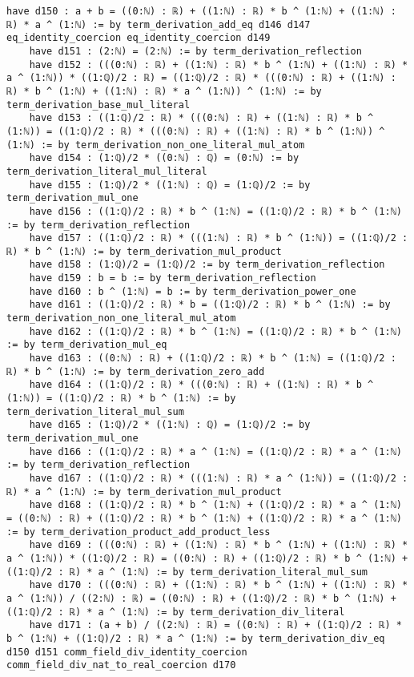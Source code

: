 \documentclass{article}
\begin{document}
\begin{tcolorbox}[colback=white!10, width=\linewidth]
\begin{lstlisting}[language=Lean4]
    have d150 : a + b = ((0:ℕ) : ℝ) + ((1:ℕ) : ℝ) * b ^ (1:ℕ) + ((1:ℕ) : ℝ) * a ^ (1:ℕ) := by term_derivation_add_eq d146 d147 eq_identity_coercion eq_identity_coercion d149
    have d151 : (2:ℕ) = (2:ℕ) := by term_derivation_reflection
    have d152 : (((0:ℕ) : ℝ) + ((1:ℕ) : ℝ) * b ^ (1:ℕ) + ((1:ℕ) : ℝ) * a ^ (1:ℕ)) * ((1:ℚ)/2 : ℝ) = ((1:ℚ)/2 : ℝ) * (((0:ℕ) : ℝ) + ((1:ℕ) : ℝ) * b ^ (1:ℕ) + ((1:ℕ) : ℝ) * a ^ (1:ℕ)) ^ (1:ℕ) := by term_derivation_base_mul_literal
    have d153 : ((1:ℚ)/2 : ℝ) * (((0:ℕ) : ℝ) + ((1:ℕ) : ℝ) * b ^ (1:ℕ)) = ((1:ℚ)/2 : ℝ) * (((0:ℕ) : ℝ) + ((1:ℕ) : ℝ) * b ^ (1:ℕ)) ^ (1:ℕ) := by term_derivation_non_one_literal_mul_atom
    have d154 : (1:ℚ)/2 * ((0:ℕ) : ℚ) = (0:ℕ) := by term_derivation_literal_mul_literal
    have d155 : (1:ℚ)/2 * ((1:ℕ) : ℚ) = (1:ℚ)/2 := by term_derivation_mul_one
    have d156 : ((1:ℚ)/2 : ℝ) * b ^ (1:ℕ) = ((1:ℚ)/2 : ℝ) * b ^ (1:ℕ) := by term_derivation_reflection
    have d157 : ((1:ℚ)/2 : ℝ) * (((1:ℕ) : ℝ) * b ^ (1:ℕ)) = ((1:ℚ)/2 : ℝ) * b ^ (1:ℕ) := by term_derivation_mul_product
    have d158 : (1:ℚ)/2 = (1:ℚ)/2 := by term_derivation_reflection
    have d159 : b = b := by term_derivation_reflection
    have d160 : b ^ (1:ℕ) = b := by term_derivation_power_one
    have d161 : ((1:ℚ)/2 : ℝ) * b = ((1:ℚ)/2 : ℝ) * b ^ (1:ℕ) := by term_derivation_non_one_literal_mul_atom
    have d162 : ((1:ℚ)/2 : ℝ) * b ^ (1:ℕ) = ((1:ℚ)/2 : ℝ) * b ^ (1:ℕ) := by term_derivation_mul_eq
    have d163 : ((0:ℕ) : ℝ) + ((1:ℚ)/2 : ℝ) * b ^ (1:ℕ) = ((1:ℚ)/2 : ℝ) * b ^ (1:ℕ) := by term_derivation_zero_add
    have d164 : ((1:ℚ)/2 : ℝ) * (((0:ℕ) : ℝ) + ((1:ℕ) : ℝ) * b ^ (1:ℕ)) = ((1:ℚ)/2 : ℝ) * b ^ (1:ℕ) := by term_derivation_literal_mul_sum
    have d165 : (1:ℚ)/2 * ((1:ℕ) : ℚ) = (1:ℚ)/2 := by term_derivation_mul_one
    have d166 : ((1:ℚ)/2 : ℝ) * a ^ (1:ℕ) = ((1:ℚ)/2 : ℝ) * a ^ (1:ℕ) := by term_derivation_reflection
    have d167 : ((1:ℚ)/2 : ℝ) * (((1:ℕ) : ℝ) * a ^ (1:ℕ)) = ((1:ℚ)/2 : ℝ) * a ^ (1:ℕ) := by term_derivation_mul_product
    have d168 : ((1:ℚ)/2 : ℝ) * b ^ (1:ℕ) + ((1:ℚ)/2 : ℝ) * a ^ (1:ℕ) = ((0:ℕ) : ℝ) + ((1:ℚ)/2 : ℝ) * b ^ (1:ℕ) + ((1:ℚ)/2 : ℝ) * a ^ (1:ℕ) := by term_derivation_product_add_product_less
    have d169 : (((0:ℕ) : ℝ) + ((1:ℕ) : ℝ) * b ^ (1:ℕ) + ((1:ℕ) : ℝ) * a ^ (1:ℕ)) * ((1:ℚ)/2 : ℝ) = ((0:ℕ) : ℝ) + ((1:ℚ)/2 : ℝ) * b ^ (1:ℕ) + ((1:ℚ)/2 : ℝ) * a ^ (1:ℕ) := by term_derivation_literal_mul_sum
    have d170 : (((0:ℕ) : ℝ) + ((1:ℕ) : ℝ) * b ^ (1:ℕ) + ((1:ℕ) : ℝ) * a ^ (1:ℕ)) / ((2:ℕ) : ℝ) = ((0:ℕ) : ℝ) + ((1:ℚ)/2 : ℝ) * b ^ (1:ℕ) + ((1:ℚ)/2 : ℝ) * a ^ (1:ℕ) := by term_derivation_div_literal
    have d171 : (a + b) / ((2:ℕ) : ℝ) = ((0:ℕ) : ℝ) + ((1:ℚ)/2 : ℝ) * b ^ (1:ℕ) + ((1:ℚ)/2 : ℝ) * a ^ (1:ℕ) := by term_derivation_div_eq d150 d151 comm_field_div_identity_coercion comm_field_div_nat_to_real_coercion d170

\end{lstlisting}
\end{tcolorbox}
\end{document}
